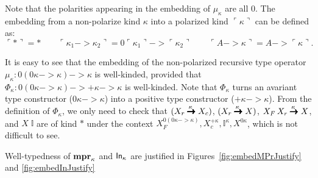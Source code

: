 Note that the polarities appearing in the embedding of $\mu_\kappa$ are all
$0$. The embedding from a non-polarize kind $\kappa$ into
a polarized kind $\ulcorner\kappa\urcorner$ can be defined as:
\[ \ulcorner * \urcorner = * \qquad
\ulcorner \kappa_1 -> \kappa_2 \urcorner =
0\ulcorner\kappa_1\urcorner -> \ulcorner\kappa_2\urcorner \qquad
\ulcorner A -> \kappa \urcorner = A -> \ulcorner \kappa \urcorner.
\]

It is easy to see that the embedding of the non-polarized recursive
type operator $\mu_\kappa : 0(0\kappa -> \kappa) -> \kappa$
is well-kinded, provided that
$\Phi_\kappa : 0(0\kappa -> \kappa) -> +\kappa -> \kappa$
is well-kinded. Note that $\Phi_\kappa$ turns an avariant type constructor
($0\kappa -> \kappa$) into a positive type constructor
($+\kappa -> \kappa$). From the definition of $\Phi_\kappa$, we only need 
to check that $(X_r \stackrel{\kappa\;}{\pmb{\pmb{->}}} X_c)$, $(X_r \stackrel{\kappa\;}{\pmb{\pmb{->}}} X)$,
$X_F\,X_r \stackrel{\kappa\;}{\pmb{\pmb{->}}} X$, and $X\;\mathbb{I}$ are of kind $*$
under the context $ X_{\!F}^{0(0\kappa -> \kappa)},
		X_c^{+\kappa}, \mathbb{I}^\kappa, X^{0\kappa}$,
which is not difficult to see.

Well-typedness of $\mathbf{mpr}_\kappa$ and $\mathsf{In}_\kappa$ are justified in
Figures~\ref{fig:embedMPrJustify} and \ref{fig:embedInJustify}


